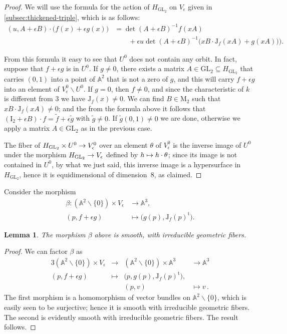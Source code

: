 \documentclass{amsart}
\numberwithin{equation}{section}
\numberwithin{subsection}{section}
\newtheorem{lemma}[theorem]{Lemma}
\theoremstyle{definition}
\theoremstyle{remark}
\renewcommand\AA{\mathbb{A}} \newcommand\BB{\mathbb{B}}
\newcommand\rI{\mathrm{I}} \newcommand\rJ{\mathrm{J}}
\newcommand\rM{\mathrm{M}} \newcommand\rN{\mathrm{N}}
\newcommand\arr{\ifinner\to\else\longrightarrow\fi}
\newcommand\arrto{\ifinner\mapsto\else\longmapsto\fi}
\newcommand\larr{\longrightarrow}
\newcommand\larrto{\longmapsto}
\renewcommand{\setminus}{\smallsetminus}
\newcommand{\GL}{\mathrm{GL}}
\newcommand{\trans}{^{\mathrm{t}}}
\newcommand\Hg{H_{\GL_2}}
\newcommand\Ve{V_{\epsilon}}
\begin{document}
\begin{proof}
We will use the formula for the action of $\Hg$ on $\Ve$ given in \ref{subsec:thickened-triple}, which is as follows:
   \begin{align*}
   (u, A + \epsilon B)\cdot \bigl(f(x) + \epsilon g(x)\bigr)
   &= \det(A + \epsilon B)^{-1}f(xA)\\
   &\qquad + \epsilon u\det(A + \epsilon B)^{-1}
   \bigl(xB \cdot \rJ_{f}(xA)  + g(xA)\bigr)\bigr).
   \end{align*}

From this formula it easy to see that $U^{0}$ does not contain any orbit. In fact, suppose that $f+\epsilon g$ is in $U^{0}$. If $g \neq 0$, there exists a matrix $A \in \GL_{2} \subseteq \Hg$ that carries $(0,1)$ into a point of $\AA^{2}$ that is not a zero of $g$, and this will carry $f+\epsilon g$ into an element of $\Ve^{0} \setminus U^{0}$. If $g = 0$, then $f \neq 0$, and since the characteristic of $k$ is different from $3$ we have $\rJ_{f}(x) \neq 0$. We can find $B \in \rM_{2}$ such that $xB \cdot \rJ_{f}(xA) \neq0$; and the from the formula above it follows that $(\rI_{2} + \epsilon B)\cdot f = \widetilde{f} + \epsilon\widetilde{g}$ with $\widetilde{g} \neq 0$. If $\widetilde{g}(0,1) \neq 0$ we are done, otherwise we apply a matrix $A \in \GL_{2}$ as in the previous case.

The fiber of $\Hg \times U^{0} \arr \Ve^{0}$ over an element $\theta$ of $\Ve^{0}$ is the inverse image of $U^{0}$ under the morphism $\Hg \arr \Ve$ defined by $h \arrto h \cdot\theta$; since its image is not contained in $U^{0}$, by what we just said, this inverse image is a hypersurface in $\Hg$, hence it is equidimensional of dimension~$8$, as claimed.
\end{proof}

Consider the morphism
   \begin{align*}
   \beta\colon (\AA^2 \setminus \{0\}) \times \Ve &\longrightarrow \AA^3,\\
   (p, f + \epsilon g) & \longmapsto 
   \bigl(g(p), \rJ_{f}(p)\trans\bigr).
   \end{align*}

\begin{lemma}\label{lem:beta-smooth}
The morphism $\beta$ above is smooth, with irreducible geometric fibers.
\end{lemma}

\begin{proof}
We can factor $\beta$ as 
  \begin{alignat*}{3}
  (\AA^2 \setminus \{0\}) \times \Ve & {}\larr{} &
  (\AA^{2}\setminus\{0\})\times\AA^{3} & {}\larr {}\AA^{3}\\
  (p, f+\epsilon g) &\larrto & \bigl(p, g(p), \rJ_{f}(p)\trans\bigr),\\
  &&(p, v)&{}\larrto {}  v\,.
  \end{alignat*}
The first morphism is a homomorphism of vector bundles on $\AA^{2}\setminus\{0\}$, which is easily seen to be surjective; hence it is smooth with irreducible geometric fibers. The second is evidently smooth with irreducible geometric fibers. The result follows.
\end{proof}
\end{document}
